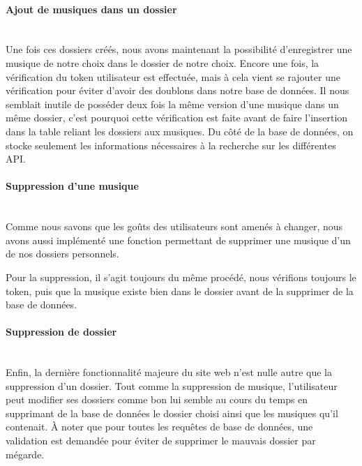 \documentclass[12pt,french]{article}
\begin{document}
\paragraph{Ajout de musiques dans un dossier \\\\} 

Une fois ces dossiers créés, nous avons maintenant la possibilité d'enregistrer une musique de notre choix dans le dossier de notre choix. Encore une fois, la vérification du \gls{token} utilisateur est effectuée, mais à cela vient se rajouter une vérification pour éviter d'avoir des doublons dans notre base de données. Il nous semblait inutile de posséder deux fois la même version d'une musique dans un même dossier, c'est pourquoi cette vérification est faite avant de faire l'insertion dans la \gls{table} reliant les dossiers aux musiques. Du côté de la base de données, on stocke seulement les informations nécessaires à la recherche sur les différentes \gls{API}.

\paragraph{Suppression d'une musique \\\\}

Comme nous savons que les goûts des utilisateurs sont amenés à changer, nous avons aussi implémenté une fonction permettant de supprimer une musique d'un de nos dossiers personnels. 

\newpage

\noindent
Pour la suppression, il s'agit toujours du même procédé, nous vérifions toujours le \gls{token}, puis que la musique existe bien dans le dossier avant de la supprimer de la base de données.

\paragraph{Suppression de dossier \\\\}

Enfin, la dernière fonctionnalité majeure du site web n'est nulle autre que la suppression d'un dossier. Tout comme la suppression de musique, l'utilisateur peut modifier ses dossiers comme bon lui semble au cours du temps en supprimant de la base de données le dossier choisi ainsi que les musiques qu'il contenait. À noter que pour toutes les requêtes de base de données, une validation est demandée pour éviter de supprimer le mauvais dossier par mégarde.
\end{document}
